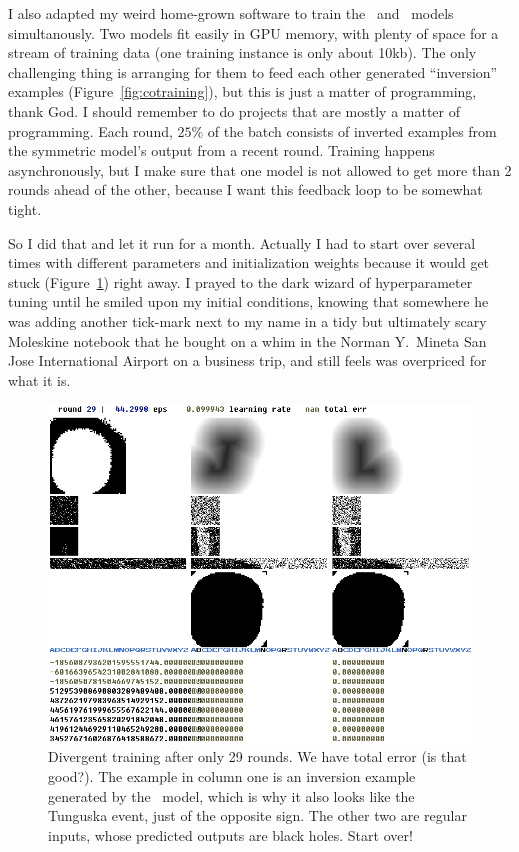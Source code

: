 \documentclass[twocolumn]{article} %
\begin{document}
I also adapted my weird home-grown software to train the
\makeuppercase\ and \makelowercase\ models simultanously. Two models
fit easily in GPU memory, with plenty of space for a stream of
training data (one training instance is only about 10kb). The only
challenging thing is arranging for them to feed each other generated
``inversion'' examples (Figure~\ref{fig:cotraining}), but this is just
a matter of programming, thank God. I should remember to do projects
that are mostly a matter of programming. Each round, $25\%$ of the
batch consists of inverted examples from the symmetric model's output
from a recent round. Training happens asynchronously, but I make sure
that one model is not allowed to get more than 2 rounds ahead of the
other, because I want this feedback loop to be somewhat tight.

So I did that and let it run for a month. Actually I had to start over
several times with different parameters and initialization weights
because it would get stuck (Figure~\ref{fig:nans}) right away. I
prayed to the dark wizard of hyperparameter tuning until he smiled
upon my initial conditions, knowing that somewhere he was adding
another tick-mark next to my name in a tidy but ultimately scary
Moleskine notebook that he bought on a whim in the Norman Y.~Mineta
San Jose International Airport on a business trip, and still feels
was overpriced for what it is.

\begin{figure}[ht]
\centering
  \includegraphics[width=0.9 \linewidth]{nans}
\caption{
  Divergent training after only 29 rounds. We have \nan{} total error
  (is that good?). The example in column one is an inversion example
  generated by the \makeuppercase\ model, which is why it also looks
  like the Tunguska event, just of the opposite sign. The other two
  are regular inputs, whose predicted outputs are black holes. Start
  over!
} \label{fig:nans}
\end{figure}
\end{document}
